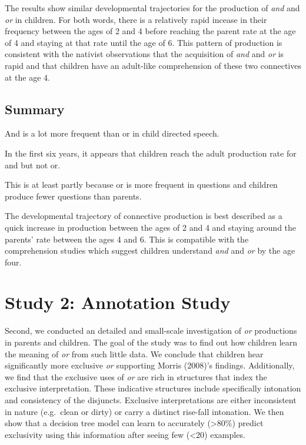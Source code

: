 \documentclass[10pt, letterpaper]{article}
\begin{document}
The results show similar developmental trajectories for the production
of \emph{and} and \emph{or} in children. For both words, there is a
relatively rapid incease in their frequency between the ages of 2 and 4
before reaching the parent rate at the age of 4 and staying at that rate
until the age of 6. This pattern of production is consistent with the
nativist observations that the acquisition of \emph{and} and \emph{or}
is rapid and that children have an adult-like comprehension of these two
connectives at the age 4.

\subsection{Summary}\label{summary}

And is a lot more frequent than or in child directed speech.

In the first six years, it appears that children reach the adult
production rate for and but not or.

This is at least partly because or is more frequent in questions and
children produce fewer questions than parents.

The developmental trajectory of connective production is best described
as a quick increase in production between the ages of 2 and 4 and
staying around the parents' rate between the ages 4 and 6. This is
compatible with the comprehension studies which suggest children
understand \emph{and} and \emph{or} by the age four.

\section{Study 2: Annotation Study}\label{study-2-annotation-study}

Second, we conducted an detailed and small-scale investigation of
\emph{or} productions in parents and children. The goal of the study was
to find out how children learn the meaning of \emph{or} from such little
data. We conclude that children hear significantly more exclusive
\emph{or} supporting Morris (2008)'s findings. Additionally, we find
that the exclusive uses of \emph{or} are rich in structures that index
the exclusive interpretation. These indicative structures include
specifically intonation and consistency of the disjuncts. Exclusive
interpretations are either inconsistent in nature (e.g.~clean or dirty)
or carry a distinct rise-fall intonation. We then show that a decision
tree model can learn to accurately (\textgreater{}80\%) predict
exclusivity using this information after seeing few (\textless{}20)
examples.
\end{document}
